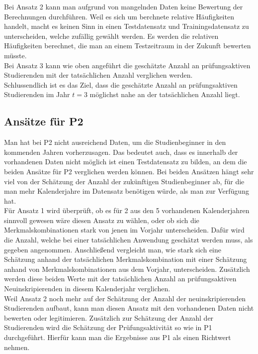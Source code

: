 Bei Ansatz 2 kann man aufgrund von mangelnden Daten keine Bewertung der Berechnungen durchf\"uhren. Weil es sich um berchnete relative H\"aufigkeiten 
handelt, macht es keinen Sinn in einen Testdatensatz und Trainingsdatensatz zu unterscheiden, welche zuf\"allig gew\"ahlt werden. Es werden die relativen 
H\"aufigkeiten berechnet, die man an einem Testzeitraum in der Zukunft bewerten m\"usste. \\

Bei Ansatz 3 kann wie oben angef\"uhrt die gesch\"atzte Anzahl an pr\"ufungsaktiven Studierenden mit der tats\"achlichen Anzahl verglichen werden. \\

Schlussendlich ist es das Ziel, dass die gesch\"atzte Anzahl an pr\"ufungsaktiven Studierenden im Jahr $t = 3$ m\"oglichst nahe an der tats\"achlichen Anzahl 
liegt. 



\subsection{Ans\"atze f\"ur P2}

Man hat bei P2 nicht ausreichend Daten, um die Studienbeginner in den kommenden Jahren  vorherzusagen. Das bedeutet auch, dass es innerhalb der vorhandenen
Daten nicht m\"oglich ist einen Testdatensatz zu bilden, an dem die beiden Ans\"atze f\"ur P2 verglichen werden k\"onnen. Bei beiden Ans\"atzen h\"angt 
sehr viel von der Sch\"atzung der Anzahl der zuk\"unftigen Studienbeginner ab, f\"ur die man mehr Kalenderjahre im Datensatz ben\"otigen w\"urde, als 
man zur Verf\"ugung hat. \\ 

F\"ur Ansatz 1 wird \"uberpr\"uft, ob es f\"ur 2 aus den 5 vorhandenen Kalenderjahren sinnvoll gewesen w\"are diesen Ansatz zu w\"ahlen, oder ob sich die 
Merkmalskombinationen stark von jenen im Vorjahr unterscheiden. Daf\"ur wird die Anzahl, welche bei einer tats\"achlichen Anwendung gesch\"atzt werden muss,
als gegeben angenommen. Anschlie{\ss}end vergleicht man, wie stark sich eine Sch\"atzung anhand der tats\"achlichen Merkmalskombination mit einer Sch\"atzung anhand von 
Merkmalskombinationen aus dem Vorjahr, unterscheiden. Zus\"atzlich werden diese beiden Werte mit der tats\"achlichen Anzahl an pr\"ufungsaktiven Neuinskripierenden 
in diesem Kalenderjahr verglichen.\\

Weil Ansatz 2 noch mehr auf der Sch\"atzung der Anzahl der neuinskripierenden Studierenden aufbaut, kann man diesen Ansatz mit den vorhandenen Daten nicht bewerten oder legitimieren. 
Zus\"atzlich zur Sch\"atzung der Anzahl der Studierenden wird die Sch\"atzung der Pr\"ufungsaktivit\"at so wie in P1 durchgef\"uhrt. Hierf\"ur kann man die 
Ergebnisse aus P1 als einen Richtwert nehmen. 
